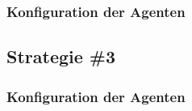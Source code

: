 \documentclass{scrartcl}
\begin{document}
\subsubsection{Konfiguration der Agenten}

\subsection{Strategie \#3}
\subsubsection{Konfiguration der Agenten}
\end{document}
